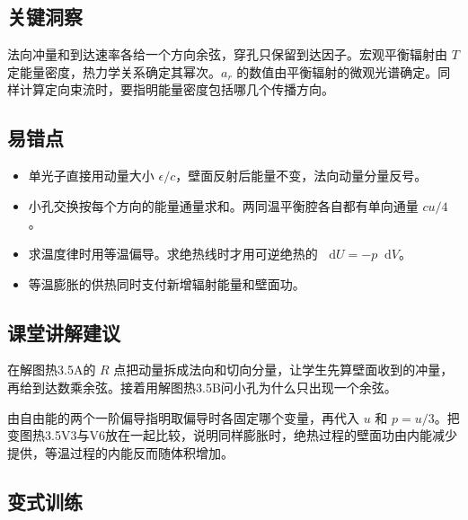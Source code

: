 \documentclass[UTF8,fontset=fandol,a4paper,11pt]{ctexart}
\newcommand{\dd}{\mathop{}\!\mathrm{d}}
\begin{document}

\subsection*{关键洞察}

法向冲量和到达速率各给一个方向余弦，穿孔只保留到达因子。宏观平衡辐射由 $T$ 定能量密度，热力学关系确定其幂次。$a_r$ 的数值由平衡辐射的微观光谱确定。同样计算定向束流时，要指明能量密度包括哪几个传播方向。



\subsection*{易错点}

\begin{itemize}
\item 单光子直接用动量大小 $\epsilon/c$，壁面反射后能量不变，法向动量分量反号。
\item 小孔交换按每个方向的能量通量求和。两同温平衡腔各自都有单向通量 $cu/4$。
\item 求温度律时用等温偏导。求绝热线时才用可逆绝热的 $\dd U=-p\dd V$。
\item 等温膨胀的供热同时支付新增辐射能量和壁面功。
\end{itemize}



\subsection*{课堂讲解建议}

在解图热3.5A的 $R$ 点把动量拆成法向和切向分量，让学生先算壁面收到的冲量，再给到达数乘余弦。接着用解图热3.5B问小孔为什么只出现一个余弦。

由自由能的两个一阶偏导指明取偏导时各固定哪个变量，再代入 $u$ 和 $p=u/3$。把变图热3.5V3与V6放在一起比较，说明同样膨胀时，绝热过程的壁面功由内能减少提供，等温过程的内能反而随体积增加。



\subsection*{变式训练}
\end{document}

